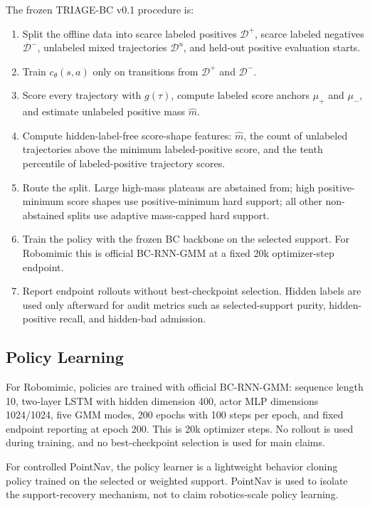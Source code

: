 \documentclass{article}
\newcommand{\Dpos}{\mathcal{D}^{+}}
\newcommand{\Dneg}{\mathcal{D}^{-}}
\newcommand{\Dunl}{\mathcal{D}^{u}}
\newcommand{\method}{TRIAGE-BC}
\begin{document}
The frozen \method{} v0.1 procedure is:
\begin{enumerate}[leftmargin=*]
  \item Split the offline data into scarce labeled positives $\Dpos$, scarce labeled negatives $\Dneg$, unlabeled mixed trajectories $\Dunl$, and held-out positive evaluation starts.
  \item Train $c_\theta(s,a)$ only on transitions from $\Dpos$ and $\Dneg$.
  \item Score every trajectory with $g(\tau)$, compute labeled score anchors $\mu_+$ and $\mu_-$, and estimate unlabeled positive mass $\hat{m}$.
  \item Compute hidden-label-free score-shape features: $\hat{m}$, the count of unlabeled trajectories above the minimum labeled-positive score, and the tenth percentile of labeled-positive trajectory scores.
  \item Route the split. Large high-mass plateaus are abstained from; high positive-minimum score shapes use positive-minimum hard support; all other non-abstained splits use adaptive mass-capped hard support.
  \item Train the policy with the frozen BC backbone on the selected support. For Robomimic this is official BC-RNN-GMM at a fixed 20k optimizer-step endpoint.
  \item Report endpoint rollouts without best-checkpoint selection. Hidden labels are used only afterward for audit metrics such as selected-support purity, hidden-positive recall, and hidden-bad admission.
\end{enumerate}

\subsection{Policy Learning}

For Robomimic, policies are trained with official BC-RNN-GMM: sequence length 10, two-layer LSTM with hidden dimension 400, actor MLP dimensions 1024/1024, five GMM modes, 200 epochs with 100 steps per epoch, and fixed endpoint reporting at epoch 200. This is 20k optimizer steps. No rollout is used during training, and no best-checkpoint selection is used for main claims.

For controlled PointNav, the policy learner is a lightweight behavior cloning policy trained on the selected or weighted support. PointNav is used to isolate the support-recovery mechanism, not to claim robotics-scale policy learning.
\end{document}
